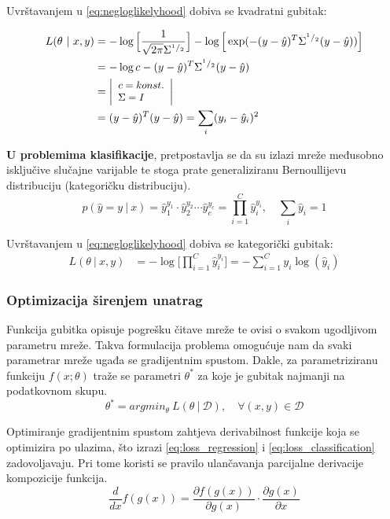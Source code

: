 \documentclass[times, utf8, numeric, diplomski]{fer}
\def\pfrac#1#2{\frac{\partial #1}{\partial #2}}
\def\dfrac#1#2{\frac{d #1}{d #2}}
\def\probsep{\ |\ }
\def\dataset{\mathcal{D}}
\begin{document}
Uvrštavanjem u \eqref{eq:negloglikelyhood} dobiva se kvadratni gubitak:

\begin{align}
\label{eq:loss_regression}
L(\theta \probsep x,y) &= - \log \Big[ \frac{1}{\sqrt{2\pi}\Sigma^{^1/_2}} \Big] - \log \Big[ \exp(-(y-\hat{y})^T\Sigma^{^1/_2}(y-\hat{y})) \Big] \nonumber \\
&= -\log c - (y-\hat{y})^T\Sigma^{^1/_2}(y-\hat{y}) \nonumber \\
&= \left|\footnotesize 
\begin{array}[c]{l} 
	c = konst. \\ 
	\Sigma = I 
\end{array}
\right| \nonumber \\
&= (y-\hat{y})^T(y-\hat{y}) = \sum_i (y_i - \hat{y}_i)^2
\end{align}

\textbf{U problemima klasifikacije}, pretpostavlja se da su izlazi mreže međusobno isključive slučajne varijable te stoga prate generaliziranu Bernoullijevu distribuciju (kategoričku distribuciju).
\begin{equation}
p(\hat{y}=y \probsep x) = \hat{y}_1^{y_1} \cdot \hat{y}_2^{y_2} \cdots \hat{y}_c^{y_c} 
= \prod_{i=1}^C \hat{y}_i^{y_i}, \quad \sum_i \hat{y}_i = 1
\end{equation}

Uvrštavanjem u \ref{eq:negloglikelyhood} dobiva se kategorički gubitak:
\begin{align}
\label{eq:loss_classification}
L(\theta \probsep x,y) &= - \log \Big[ \prod_{i=1}^C \hat{y}_i^{y_i} \Big] = - \sum_{i=1}^C y_i \log (\hat{y}_i)
\end{align}

\subsubsection{Optimizacija širenjem unatrag}
\label{sec:backprop}
Funkcija gubitka opisuje pogrešku čitave mreže te ovisi o svakom ugodljivom parametru mreže. Takva formulacija problema omogućuje nam da svaki parametrar mreže ugađa se gradijentnim spustom. Dakle, za parametriziranu funkciju $f(x;\theta)$ traže se parametri $\theta^*$ za koje je gubitak najmanji na podatkovnom skupu.
\begin{equation}
\theta^* = argmin_\theta\ L(\theta \probsep \dataset), \quad \forall (x,y) \in \dataset
\end{equation}

Optimiranje gradijentnim spustom zahtjeva derivabilnost funkcije koja se optimizira po ulazima, što izrazi \eqref{eq:loss_regression} i \eqref{eq:loss_classification} zadovoljavaju. Pri tome koristi se pravilo ulančavanja parcijalne derivacije kompozicije funkcija.
\begin{equation}
\label{eq:partial_rule}
\dfrac{}{x} f(g(x)) = \pfrac{f(g(x))}{g(x)} \cdot \pfrac{g(x)}{x}
\end{equation}
\end{document}
